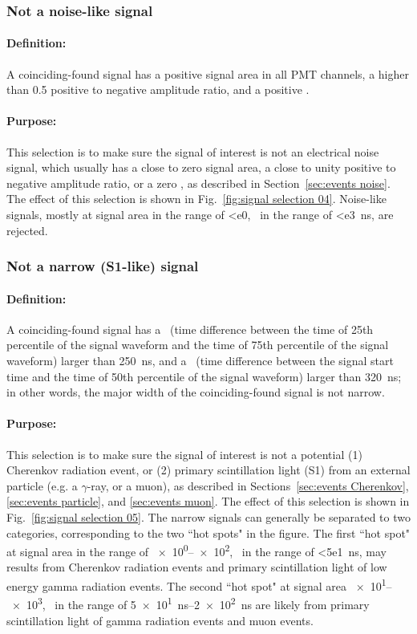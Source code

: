 \subsubsection{Not a noise-like signal}
\paragraph{Definition:}
A coinciding-found signal has a positive signal area in all PMT channels, a higher than \num{0.5} positive to negative amplitude ratio,  and a positive \rpd .
\paragraph{Purpose:}
This selection is to make sure the signal of interest is not an electrical noise signal, which usually has a close to zero signal area, a close to unity positive to negative amplitude ratio, or a zero \rpd , as described in Section~\ref{sec:events noise}. The effect of this selection is shown in Fig.~\ref{fig:signal selection 04}. Noise-like signals, mostly at signal area in the range of \SI{<e0}{\phe}, \rpd\ in the range of \SI{<e3}{\ns}, are rejected.  

\subsubsection{Not a narrow (S1-like) signal}
\label{cuts:S1}
\paragraph{Definition:}
A coinciding-found signal has a \stw\ (time difference between the time of 25th percentile of the signal waveform and the time of 75th percentile of the signal waveform) larger than \SI{250}{\ns}, and  a \shw\ (time difference between the signal start time and the time of 50th percentile of the signal waveform) larger than \SI{320}{\ns}; in other words, the major width of the coinciding-found signal is not narrow. 
\paragraph{Purpose:}
This selection is to make sure the signal of interest is not a potential (1) Cherenkov radiation event, or (2) primary scintillation light (S1) from an external particle (e.g. a $\gamma$-ray, or a muon), as described in Sections~\ref{sec:events Cherenkov}, \ref{sec:events particle}, and \ref{sec:events muon}. The effect of this selection is shown in Fig.~\ref{fig:signal selection 05}. The narrow signals can generally be separated to two categories, corresponding to the two ``hot spots" in the figure. The first ``hot spot" at signal area in the range of \SIrange{e0}{e2}{\phe}, \rpd\ in the range of \SI{<5e1}{\ns}, may results from Cherenkov radiation events and primary scintillation light of low energy gamma radiation events. The second ``hot spot" at signal area \SIrange{e1}{e3}{\phe}, \rpd\ in the range of \SIrange{5e1}{2e2}{\ns} are likely from primary scintillation light of gamma radiation events and muon events. 

